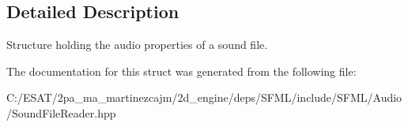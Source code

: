 \subsection{Detailed Description}
Structure holding the audio properties of a sound file. 

The documentation for this struct was generated from the following file\+:\begin{DoxyCompactItemize}
\item 
C\+:/\+E\+S\+A\+T/2pa\+\_\+ma\+\_\+martinezcajm/2d\+\_\+engine/deps/\+S\+F\+M\+L/include/\+S\+F\+M\+L/\+Audio/Sound\+File\+Reader.\+hpp\end{DoxyCompactItemize}
